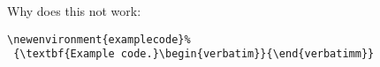  Why does this not work:
\begin{verbatim}
\newenvironment{examplecode}%
 {\textbf{Example code.}\begin{verbatim}}{\end{verbatimm}}
\end{verbatim}
